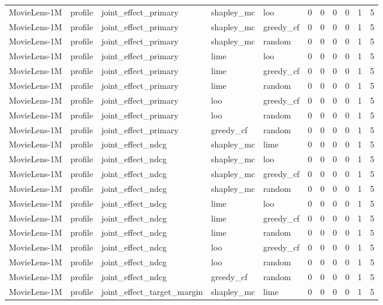 \begin{table}[t]
{\begin{tabular}{lllllrrrrrr}
MovieLens-1M & profile & joint\_effect\_primary & shapley\_mc & loo & 0 & 0 & 0 & 0 & 1 & 5 \\
MovieLens-1M & profile & joint\_effect\_primary & shapley\_mc & greedy\_cf & 0 & 0 & 0 & 0 & 1 & 5 \\
MovieLens-1M & profile & joint\_effect\_primary & shapley\_mc & random & 0 & 0 & 0 & 0 & 1 & 5 \\
MovieLens-1M & profile & joint\_effect\_primary & lime & loo & 0 & 0 & 0 & 0 & 1 & 5 \\
MovieLens-1M & profile & joint\_effect\_primary & lime & greedy\_cf & 0 & 0 & 0 & 0 & 1 & 5 \\
MovieLens-1M & profile & joint\_effect\_primary & lime & random & 0 & 0 & 0 & 0 & 1 & 5 \\
MovieLens-1M & profile & joint\_effect\_primary & loo & greedy\_cf & 0 & 0 & 0 & 0 & 1 & 5 \\
MovieLens-1M & profile & joint\_effect\_primary & loo & random & 0 & 0 & 0 & 0 & 1 & 5 \\
MovieLens-1M & profile & joint\_effect\_primary & greedy\_cf & random & 0 & 0 & 0 & 0 & 1 & 5 \\
MovieLens-1M & profile & joint\_effect\_ndcg & shapley\_mc & lime & 0 & 0 & 0 & 0 & 1 & 5 \\
MovieLens-1M & profile & joint\_effect\_ndcg & shapley\_mc & loo & 0 & 0 & 0 & 0 & 1 & 5 \\
MovieLens-1M & profile & joint\_effect\_ndcg & shapley\_mc & greedy\_cf & 0 & 0 & 0 & 0 & 1 & 5 \\
MovieLens-1M & profile & joint\_effect\_ndcg & shapley\_mc & random & 0 & 0 & 0 & 0 & 1 & 5 \\
MovieLens-1M & profile & joint\_effect\_ndcg & lime & loo & 0 & 0 & 0 & 0 & 1 & 5 \\
MovieLens-1M & profile & joint\_effect\_ndcg & lime & greedy\_cf & 0 & 0 & 0 & 0 & 1 & 5 \\
MovieLens-1M & profile & joint\_effect\_ndcg & lime & random & 0 & 0 & 0 & 0 & 1 & 5 \\
MovieLens-1M & profile & joint\_effect\_ndcg & loo & greedy\_cf & 0 & 0 & 0 & 0 & 1 & 5 \\
MovieLens-1M & profile & joint\_effect\_ndcg & loo & random & 0 & 0 & 0 & 0 & 1 & 5 \\
MovieLens-1M & profile & joint\_effect\_ndcg & greedy\_cf & random & 0 & 0 & 0 & 0 & 1 & 5 \\
MovieLens-1M & profile & joint\_effect\_target\_margin & shapley\_mc & lime & 0 & 0 & 0 & 0 & 1 & 5 \\

\end{tabular}}
\end{table}
